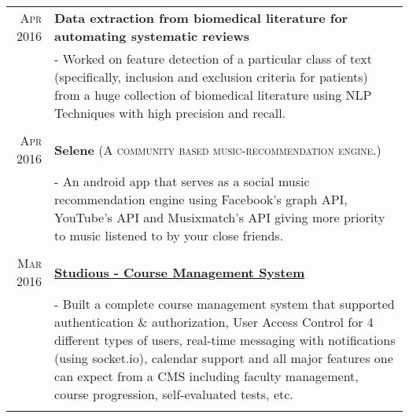 \documentclass[a4paper,10pt]{extarticle} %
\begin{document}
\begin{tabular}{r|p{17cm}}

\textsc{Apr 2016} & \textbf{Data extraction from biomedical literature for automating systematic reviews} \\
& \footnotesize{- Worked on feature detection of a particular class of text (specifically, inclusion and exclusion criteria for patients) from a huge collection of biomedical literature using NLP Techniques with high precision and recall.}\\
\multicolumn{2}{c}{} \\

\textsc{Apr 2016} & \textbf{Selene} \textsc{(A community based music-recommendation engine.)} \\
& \footnotesize{- An android app that serves as a social music recommendation engine using Facebook's graph API, YouTube's API and Musixmatch's API giving more priority to music listened to by your close friends.}\\
\multicolumn{2}{c}{} \\

\textsc{Mar 2016} & \textbf{\href{https://github.com/sandeepkumarpani888/dbmsass3}{Studious - Course Management System}}\\
& \footnotesize{- Built a complete course management system that supported authentication \& authorization, User Access Control for 4 different types of users, real-time messaging with notifications (using socket.io), calendar support and all major features one can expect from a CMS including faculty management, course progression, self-evaluated tests, etc.}\\
\multicolumn{2}{c}{} \\


\end{tabular}
\end{document}
